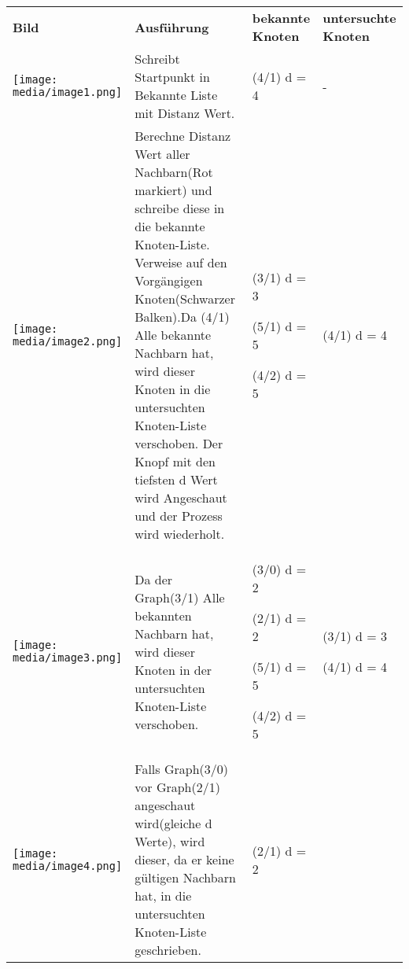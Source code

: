 \begin{longtable}[]{@{}llll@{}}
\toprule
\endhead
\textbf{Bild} & \textbf{Ausführung} & \textbf{bekannte Knoten} &
\textbf{untersuchte Knoten}\tabularnewline
\texttt{[image: media/image1.png]} &
Schreibt Startpunkt in Bekannte Liste mit Distanz Wert. & (4/1) d = 4 &
-\tabularnewline
\begin{minipage}[t]{0.22\columnwidth}\raggedright
\texttt{[image: media/image2.png]}\strut
\end{minipage} & \begin{minipage}[t]{0.22\columnwidth}\raggedright
Berechne Distanz Wert aller Nachbarn(Rot markiert) und schreibe diese in
die bekannte Knoten-Liste. Verweise auf den Vorgängigen Knoten(Schwarzer
Balken).Da (4/1) Alle bekannte Nachbarn hat, wird dieser Knoten in die
untersuchten Knoten-Liste verschoben. Der Knopf mit den tiefsten d Wert
wird Angeschaut und der Prozess wird wiederholt.\strut
\end{minipage} & \begin{minipage}[t]{0.22\columnwidth}\raggedright
(3/1) d = 3

(5/1) d = 5

(4/2) d = 5\strut
\end{minipage} & \begin{minipage}[t]{0.22\columnwidth}\raggedright
(4/1) d = 4\strut
\end{minipage}\tabularnewline
\begin{minipage}[t]{0.22\columnwidth}\raggedright
\texttt{[image: media/image3.png]}\strut
\end{minipage} & \begin{minipage}[t]{0.22\columnwidth}\raggedright
Da der Graph(3/1) Alle bekannten Nachbarn hat, wird dieser Knoten in der
untersuchten Knoten-Liste verschoben.\strut
\end{minipage} & \begin{minipage}[t]{0.22\columnwidth}\raggedright
(3/0) d = 2

(2/1) d = 2

(5/1) d = 5

(4/2) d = 5\strut
\end{minipage} & \begin{minipage}[t]{0.22\columnwidth}\raggedright
(3/1) d = 3

(4/1) d = 4\strut
\end{minipage}\tabularnewline
\begin{minipage}[t]{0.22\columnwidth}\raggedright
\texttt{[image: media/image4.png]}\strut
\end{minipage} & \begin{minipage}[t]{0.22\columnwidth}\raggedright
Falls Graph(3/0) vor Graph(2/1) angeschaut wird(gleiche d Werte), wird
dieser, da er keine gültigen Nachbarn hat, in die untersuchten
Knoten-Liste geschrieben.\strut
\end{minipage} & \begin{minipage}[t]{0.22\columnwidth}\raggedright
(2/1) d = 2


\end{minipage}
\end{longtable}
